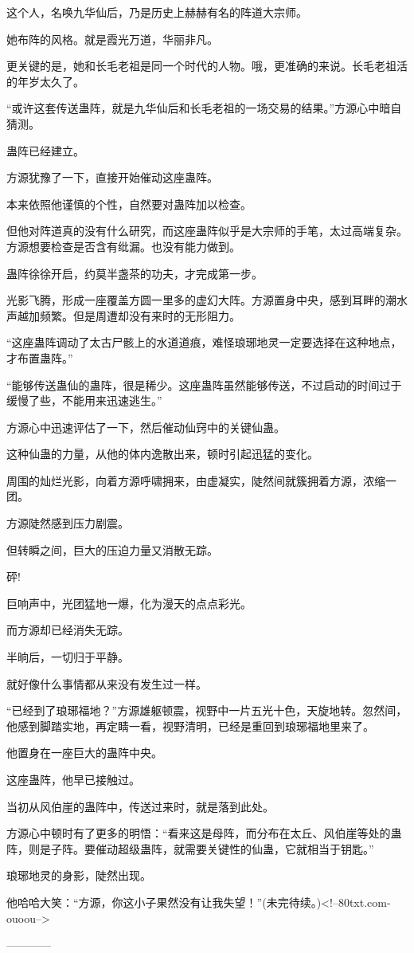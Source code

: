 \begin{this_body}
这个人，名唤九华仙后，乃是历史上赫赫有名的阵道大宗师。

她布阵的风格。就是霞光万道，华丽非凡。

更关键的是，她和长毛老祖是同一个时代的人物。哦，更准确的来说。长毛老祖活的年岁太久了。

“或许这套传送蛊阵，就是九华仙后和长毛老祖的一场交易的结果。”方源心中暗自猜测。

蛊阵已经建立。

方源犹豫了一下，直接开始催动这座蛊阵。

本来依照他谨慎的个性，自然要对蛊阵加以检查。

但他对阵道真的没有什么研究，而这座蛊阵似乎是大宗师的手笔，太过高端复杂。方源想要检查是否含有纰漏。也没有能力做到。

蛊阵徐徐开启，约莫半盏茶的功夫，才完成第一步。

光影飞腾，形成一座覆盖方圆一里多的虚幻大阵。方源置身中央，感到耳畔的潮水声越加频繁。但是周遭却没有来时的无形阻力。

“这座蛊阵调动了太古尸骸上的水道道痕，难怪琅琊地灵一定要选择在这种地点，才布置蛊阵。”

“能够传送蛊仙的蛊阵，很是稀少。这座蛊阵虽然能够传送，不过启动的时间过于缓慢了些，不能用来迅速逃生。”

方源心中迅速评估了一下，然后催动仙窍中的关键仙蛊。

这种仙蛊的力量，从他的体内逸散出来，顿时引起迅猛的变化。

周围的灿烂光影，向着方源呼啸拥来，由虚凝实，陡然间就簇拥着方源，浓缩一团。

方源陡然感到压力剧震。

但转瞬之间，巨大的压迫力量又消散无踪。

砰!

巨响声中，光团猛地一爆，化为漫天的点点彩光。

而方源却已经消失无踪。

半晌后，一切归于平静。

就好像什么事情都从来没有发生过一样。

“已经到了琅琊福地？”方源雄躯顿震，视野中一片五光十色，天旋地转。忽然间，他感到脚踏实地，再定睛一看，视野清明，已经是重回到琅琊福地里来了。

他置身在一座巨大的蛊阵中央。

这座蛊阵，他早已接触过。

当初从风伯崖的蛊阵中，传送过来时，就是落到此处。

方源心中顿时有了更多的明悟：“看来这是母阵，而分布在太丘、风伯崖等处的蛊阵，则是子阵。要催动超级蛊阵，就需要关键性的仙蛊，它就相当于钥匙。”

琅琊地灵的身影，陡然出现。

他哈哈大笑：“方源，你这小子果然没有让我失望！”(未完待续。)<!--80txt.com-ouoou-->

------------

\end{this_body}

